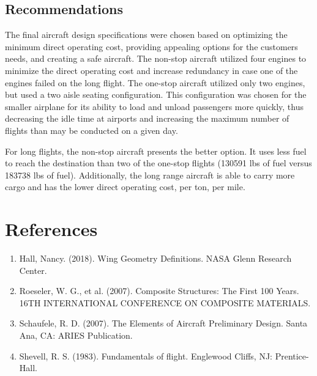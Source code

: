 \documentclass{article}
\begin{document}
    \subsection{Recommendations}
    \label{sec:Recommendations}
        \begin{flushleft}
            The final aircraft design specifications were chosen based on
            optimizing the minimum direct operating cost, providing appealing
            options for the customers needs, and creating a safe aircraft. The
            non-stop aircraft utilized four engines to minimize the direct
            operating cost and increase redundancy in case one of the engines
            failed on the long flight. The one-stop aircraft utilized only two
            engines, but used a two aisle seating configuration. This
            configuration was chosen for the smaller airplane for its ability to
            load and unload passengers more quickly, thus decreasing the idle
            time at airports and increasing the maximum number of flights than
            may be conducted on a given day.

            For long flights, the non-stop aircraft presents the better option.
            It uses less fuel to reach the destination than two of the one-stop
            flights (130591 lbs of fuel versus 183738 lbs of fuel). Additionally,
            the long range aircraft is able to carry more cargo and has the
            lower direct operating cost, per ton, per mile.
        \end{flushleft}

    \section{References}
        \begin{flushleft}
            \begin{enumerate}
                \item Hall, Nancy. (2018). Wing Geometry Definitions. NASA Glenn Research Center.
                \item Roeseler, W. G., et al. (2007). Composite Structures: The First 100 Years. 16TH INTERNATIONAL CONFERENCE ON COMPOSITE MATERIALS.
                \item Schaufele, R. D. (2007). The Elements of Aircraft Preliminary Design. Santa Ana, CA: ARIES Publication.
                \item Shevell, R. S. (1983). Fundamentals of flight. Englewood Cliffs, NJ: Prentice-Hall.
            \end{enumerate}
        \end{flushleft}
\end{document}

